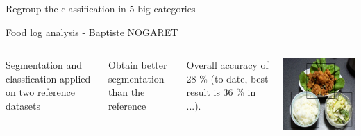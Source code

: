 \documentclass[aspectratio=169]{beamer}
\newenvironment{myframe}[1][t]{\begin{frame}[#1]{\secname}{\subsecname}}{\end{frame}}
\begin{document}
    \begin{myframe}
        Regroup the classification in 5 big categories
    \end{myframe}
    
    \begin{frame}{Food log analysis - Baptiste NOGARET}        
        \begin{columns}
            
            Segmentation and classfication applied on two reference datasets
            
            Obtain better segmentation than the reference
            
            Overall accuracy of 28 \% (to date, best result is 36 \% in ...).
            
            \includegraphics[width=\textwidth]{../img/seg_97_gt}
        \end{columns}
    \end{frame}
   
\end{document}
